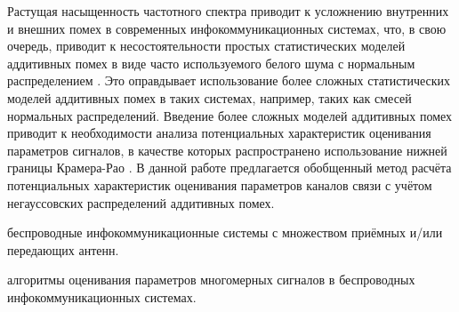 Растущая насыщенность частотного спектра приводит к усложнению внутренних и внешних помех в современных инфокоммуникационных системах, что, в свою очередь, приводит к несостоятельности простых статистических моделей аддитивных помех в виде часто используемого белого шума с нормальным распределением \cite{Kozick2000, Kalyani2012}. Это оправдывает использование более сложных статистических моделей аддитивных помех в таких системах, например, таких как смесей нормальных распределений. Введение более сложных моделей аддитивных помех приводит к необходимости анализа потенциальных характеристик оценивания параметров сигналов, в качестве которых распространено использование нижней границы Крамера-Рао \cite{Cramer1993, KayS.1993}. В данной работе предлагается обобщенный метод расчёта потенциальных характеристик оценивания параметров каналов связи с учётом негауссовских распределений аддитивных помех.

{\object} беспроводные инфокоммуникационные системы с множеством приёмных и/или передающих антенн.

{\predmet} алгоритмы оценивания параметров многомерных сигналов в беспроводных инфокоммуникационных системах.

